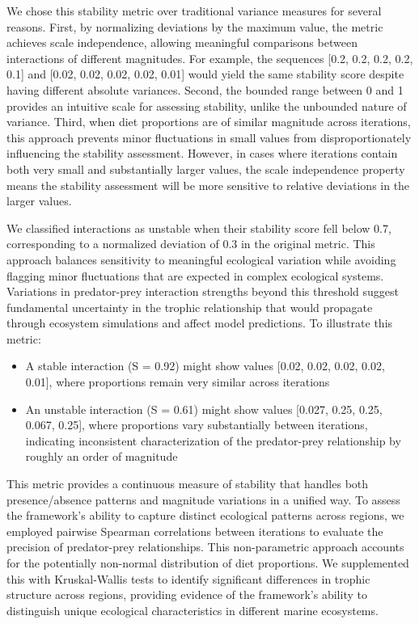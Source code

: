 We chose this stability metric over traditional variance measures for several reasons. First, by normalizing deviations by the maximum value, the metric achieves scale independence, allowing meaningful comparisons between interactions of different magnitudes. For example, the sequences [0.2, 0.2, 0.2, 0.2, 0.1] and [0.02, 0.02, 0.02, 0.02, 0.01] would yield the same stability score despite having different absolute variances. Second, the bounded range between 0 and 1 provides an intuitive scale for assessing stability, unlike the unbounded nature of variance. Third, when diet proportions are of similar magnitude across iterations, this approach prevents minor fluctuations in small values from disproportionately influencing the stability assessment. However, in cases where iterations contain both very small and substantially larger values, the scale independence property means the stability assessment will be more sensitive to relative deviations in the larger values.

We classified interactions as unstable when their stability score fell below 0.7, corresponding to a normalized deviation of 0.3 in the original metric. This approach balances sensitivity to meaningful ecological variation while avoiding flagging minor fluctuations that are expected in complex ecological systems. Variations in predator-prey interaction strengths beyond this threshold suggest fundamental uncertainty in the trophic relationship that would propagate through ecosystem simulations and affect model predictions. To illustrate this metric:

\begin{itemize}
    \item A stable interaction (S = 0.92) might show values [0.02, 0.02, 0.02, 0.02, 0.01], where proportions remain very similar across iterations
    \item An unstable interaction (S = 0.61) might show values [0.027, 0.25, 0.25, 0.067, 0.25], where proportions vary substantially between iterations, indicating inconsistent characterization of the predator-prey relationship by roughly an order of magnitude
\end{itemize}

This metric provides a continuous measure of stability that handles both presence/absence patterns and magnitude variations in a unified way. To assess the framework's ability to capture distinct ecological patterns across regions, we employed pairwise Spearman correlations between iterations to evaluate the precision of predator-prey relationships. This non-parametric approach accounts for the potentially non-normal distribution of diet proportions. We supplemented this with Kruskal-Wallis tests to identify significant differences in trophic structure across regions, providing evidence of the framework's ability to distinguish unique ecological characteristics in different marine ecosystems.

